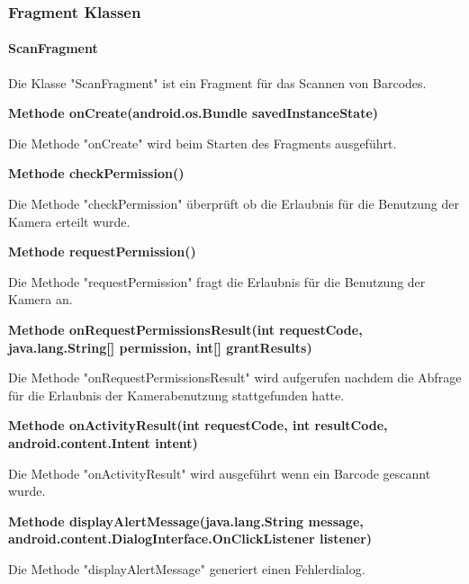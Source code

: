 \documentclass{scrartcl}
\begin{document}
\subsubsection{Fragment Klassen}

\paragraph{ScanFragment}
Die Klasse "ScanFragment" ist ein Fragment für das Scannen von Barcodes. \newline 

\noindent\textbf{Methode onCreate(android.os.Bundle savedInstanceState)}

\noindent Die Methode "onCreate" wird beim Starten des Fragments ausgeführt. \newline 

\noindent\textbf{Methode checkPermission()}

\noindent Die Methode "checkPermission" überprüft ob die Erlaubnis für die Benutzung der Kamera erteilt wurde. \newline 

\noindent\textbf{Methode requestPermission()}

\noindent Die Methode "requestPermission" fragt die Erlaubnis für die Benutzung der Kamera an. \newline 

\noindent\textbf{Methode onRequestPermissionsResult(int requestCode, \newline              java.lang.String[] permission, int[] grantResults)}

\noindent Die Methode "onRequestPermissionsResult" wird aufgerufen nachdem die Abfrage für die Erlaubnis der Kamerabenutzung stattgefunden hatte. \newline 

\noindent\textbf{Methode onActivityResult(int requestCode, \newline 
int resultCode, android.content.Intent intent)}

\noindent Die Methode "onActivityResult" wird ausgeführt wenn ein Barcode gescannt wurde. \newline 

\noindent\textbf{Methode displayAlertMessage(java.lang.String message, \newline         android.content.DialogInterface.OnClickListener listener)}

\noindent Die Methode "displayAlertMessage" generiert einen Fehlerdialog. \newline 
\end{document}
